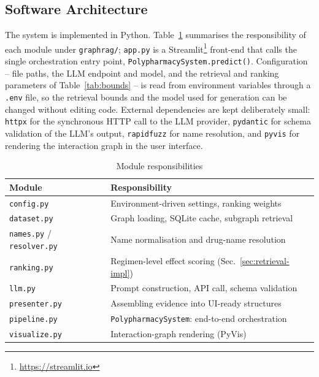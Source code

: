 \documentclass[11pt]{report}
\begin{document}
\subsection{Software Architecture}
\label{sec:architecture}

The system is implemented in Python. Table~\ref{tab:modules} summarises the
responsibility of each module under \texttt{graphrag/}; \texttt{app.py} is a
Streamlit\footnote{\url{https://streamlit.io}} front-end that calls the
single orchestration entry point, \texttt{PolypharmacySystem.predict()}.
Configuration -- file paths, the LLM endpoint and model, and the retrieval
and ranking parameters of Table~\ref{tab:bounds} -- is read from
environment variables through a \texttt{.env} file, so the retrieval bounds
and the model used for generation can be changed without editing code.
External dependencies are kept deliberately small: \texttt{httpx} for the
synchronous HTTP call to the LLM provider, \texttt{pydantic} for schema
validation of the LLM's output, \texttt{rapidfuzz} for name resolution, and
\texttt{pyvis} for rendering the interaction graph in the user interface.

\begin{table}[t]
  \caption{Module responsibilities}
  \label{tab:modules}
  \centering
  \begin{tabular}{@{}ll@{}}
    \toprule
    Module & Responsibility \\
    \midrule
    \texttt{config.py}            & Environment-driven settings, ranking weights \\
    \texttt{dataset.py}           & Graph loading, SQLite cache, subgraph retrieval \\
    \texttt{names.py} / \texttt{resolver.py} & Name normalisation and drug-name resolution \\
    \texttt{ranking.py}           & Regimen-level effect scoring (Sec.~\ref{sec:retrieval-impl}) \\
    \texttt{llm.py}               & Prompt construction, API call, schema validation \\
    \texttt{presenter.py}         & Assembling evidence into UI-ready structures \\
    \texttt{pipeline.py}          & \texttt{PolypharmacySystem}: end-to-end orchestration \\
    \texttt{visualize.py}         & Interaction-graph rendering (PyVis) \\
    \bottomrule
  \end{tabular}
\end{table}
\end{document}
